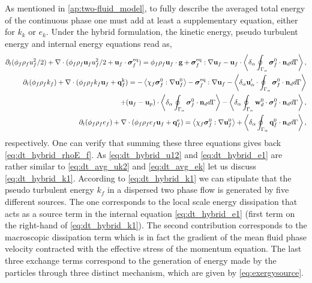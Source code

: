 As mentioned in \ref{ap:two-fluid_model}, to fully describe the averaged total energy of the continuous phase one must add at least a supplementary equation, either for $k_k$ or $e_k$.  
Under the hybrid formulation, the kinetic energy, pseudo turbulent energy and internal energy equations read as,
\begin{align}
    \partial_t (\phi_f \rho_fu_f^2/2)  
    + \mathbf{\nabla}\cdot (
        \phi_f \rho_f\textbf{u}_fu_f^2/2
        + \textbf{u}_f \cdot \bm{\sigma}_f^\text{eq}
    )
    = 
    \phi_f \rho_f \textbf{u}_f\cdot \textbf{g} 
    + \bm{\sigma}_f^\text{eq} : \mathbf{\nabla} \textbf{u}_f
    -  \textbf{u}_f\cdot 
        \left<\delta_\alpha \oint_{\Gamma_{\alpha}} {\bm{\sigma}_f^0 \cdot \textbf{n}_d} d\Gamma\right>,
        \label{eq:dt_hybrid_u12}
        \\
    \label{eq:dt_hybrid_k1}
    \partial_t (\phi_f\rho_fk_f)  
    + \mathbf{\nabla}\cdot (
        \phi_f\rho_fk_f\textbf{u}_f
        + \textbf{q}_f^\text{k} 
        )
    = 
    - \left<\chi_f\bm{\sigma}_f^0 : \mathbf{\nabla} \textbf{u}_f^0\right>
    - \bm{\sigma}_f^\text{eq} : \mathbf{\nabla} \textbf{u}_f\nonumber
    - \left<\delta_\alpha  \textbf{u}_\alpha' \cdot \oint_{\Gamma_{\alpha}}   \bm{\sigma}_f^0 \cdot \textbf{n}_d d\Gamma\right>\\
    + (\textbf{u}_f - \textbf{u}_p)\cdot \left<\delta_\alpha \oint_{\Gamma_{\alpha}} {\bm{\sigma}_f^0 \cdot \textbf{n}_d} d\Gamma\right> 
    - \left<\delta_\alpha  \oint_{\Gamma_{\alpha}} \textbf{w}_d^0 \cdot \bm{\sigma}_f^0 \cdot \textbf{n}_d d\Gamma\right>,
    \\
    \label{eq:dt_hybrid_e1}
    \partial_t (\phi_f\rho_fe_f)  
    + \mathbf{\nabla}\cdot (
        \phi_f \rho_fe_f\textbf{u}_f
        +
        \textbf{q}_f^\text{e} 
        )
    = 
    \left<\chi_f\bm{\sigma}_f^0 : \mathbf{\nabla} \textbf{u}_f^0\right>
    + \left<\delta_\alpha \oint_{\Gamma_{\alpha}} {\textbf{q}_f^0 \cdot \textbf{n}_d} d\Gamma\right>,
\end{align}
respectively. 
One can verify that summing these three equations gives back \ref{eq:dt_hybrid_rhoE_f}. 
As \ref{eq:dt_hybrid_u12} and \ref{eq:dt_hybrid_e1} are rather similar to \ref{eq:dt_avg_uk2} and \ref{eq:dt_avg_ek} let us discuss \ref{eq:dt_hybrid_k1}. 
According to  \ref{eq:dt_hybrid_k1} we can stipulate that the pseudo turbulent energy $k_f$ in a dispersed two phase flow is generated by five different sources. 
The one corresponds to the local scale energy dissipation that acts as a source term in the internal equation \eqref{eq:dt_hybrid_e1} (first term on the right-hand of \ref{eq:dt_hybrid_k1}). 
The second contribution corresponds to the macroscopic dissipation term which is in fact the gradient of the mean fluid phase velocity contracted with the effective stress of the momentum equation.  
The last three exchange terms correspond to the generation of energy made by the particles through three distinct mechanism, which are given by \ref{eq:exergysource}. 
